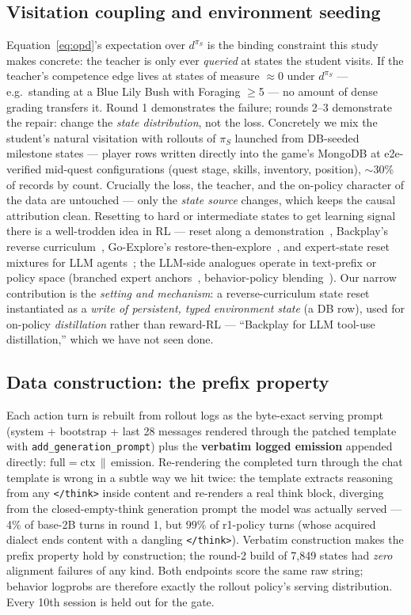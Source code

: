 \documentclass[11pt]{article}
\begin{document}
\subsection{Visitation coupling and environment seeding}
\label{sec:visitation}
Equation~\ref{eq:opd}'s expectation over $d^{\pi_S}$ is the binding constraint this study makes
concrete: the teacher is only ever \emph{queried} at states the student visits. If the teacher's
competence edge lives at states of measure $\approx 0$ under $d^{\pi_S}$ --- e.g.\ standing at a
Blue Lily Bush with Foraging $\ge$5 --- no amount of dense grading transfers it. Round 1
demonstrates the failure; rounds 2--3 demonstrate the repair: change the \emph{state
distribution}, not the loss. Concretely we mix the student's natural visitation with rollouts of
$\pi_S$ launched from DB-seeded milestone states --- player rows written directly into the game's
MongoDB at e2e-verified mid-quest configurations (quest stage, skills, inventory, position),
$\sim$30\% of records by count. Crucially the loss, the teacher, and the on-policy character of
the data are untouched --- only the \emph{state source} changes, which keeps the causal
attribution clean. Resetting to hard or intermediate states to get learning signal there is a
well-trodden idea in RL --- reset along a demonstration~\cite{salchen}, Backplay's reverse
curriculum~\cite{backplay}, Go-Explore's restore-then-explore~\cite{goexplore}, and expert-state
reset mixtures for LLM agents~\cite{reset5050}; the LLM-side analogues operate in text-prefix or
policy space (branched expert anchors~\cite{bread}, behavior-policy blending~\cite{trb}). Our
narrow contribution is the \emph{setting and mechanism}: a reverse-curriculum state reset
instantiated as a \emph{write of persistent, typed environment state} (a DB row), used for
on-policy \emph{distillation} rather than reward-RL --- ``Backplay for LLM tool-use
distillation,'' which we have not seen done.

\subsection{Data construction: the prefix property}
\label{sec:prefix}
Each action turn is rebuilt from rollout logs as the byte-exact serving prompt (system +
bootstrap + last 28 messages rendered through the patched template with
\texttt{add\_generation\_prompt}) plus the \textbf{verbatim logged emission} appended directly:
$\text{full} = \text{ctx} \,\|\, \text{emission}$. Re-rendering the completed turn through the
chat template is wrong in a subtle way we hit twice: the template extracts reasoning from any
\texttt{</think>} inside content and re-renders a real think block, diverging from the
closed-empty-think generation prompt the model was actually served --- 4\% of base-2B turns in
round 1, but $99\%$ of r1-policy turns (whose acquired dialect ends content with a
dangling \texttt{</think>}). Verbatim construction makes the prefix property hold by
construction; the round-2 build of 7{,}849 states had \emph{zero} alignment failures of any
kind. Both endpoints score the same raw string; behavior logprobs are therefore exactly the
rollout policy's serving distribution. Every 10th session is held out for the gate.
\end{document}
